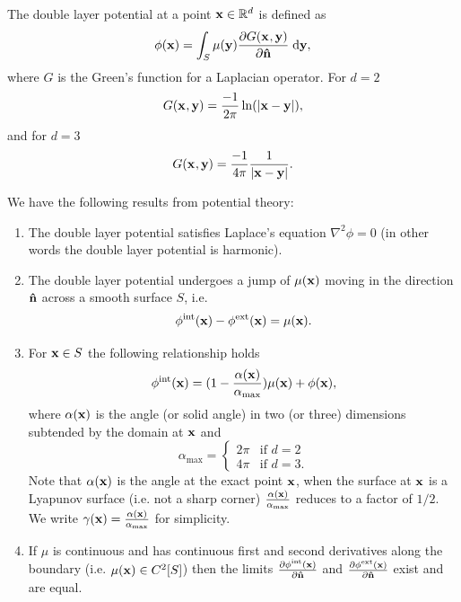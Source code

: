 The double layer potential at a point $\mathbf{x} \in \mathbb{R}^d$ is defined as \cite{eom_double_layer_potential}
\begin{equation}
  \label{eq:3}
  \phi(\mathbf{x}) = \int_{S} \mu(\mathbf{y}) \frac{\partial G(\mathbf{x}_{},\mathbf{y})}{\partial \mathbf{\hat{n}}} {\; \text{d}} \mathbf{y},
\end{equation}
where $G$ is the Green's function for a Laplacian operator.
For $d=2$
\[ G(\mathbf{x}_{},\mathbf{y}) = \dfrac{-1}{2\pi}\ln(|\mathbf{x} - \mathbf{y}|), \]
and for $d=3$
\begin{equation} G(\mathbf{x}_{},\mathbf{y}) = \dfrac{-1}{4 \pi} \dfrac{1}{|\mathbf{x} - \mathbf{y}|}.
  \label{eqn:greenslaplacian3d}
\end{equation}


We have the following results from potential theory:\cite{Sternberg1946}
\begin{enumerate}
\item The double layer potential satisfies Laplace's equation $\nabla^2 \phi = 0$ (in other words the double layer potential is harmonic).%

\item The double layer potential undergoes a jump of $\mu(\mathbf{x})$ moving in the direction $\mathbf{\hat{n}}$ across a smooth surface $S$, i.e.
  \begin{equation}
    \label{eq:15}
    \phi^{\text{int}}(\mathbf{x}) - \phi^{\text{ext}}(\mathbf{x}) = \mu(\mathbf{x}).
  \end{equation}

\item For $\mathbf{x} \in S$ the following relationship holds
  \begin{equation}
    \phi^{\text{int}}(\mathbf{x}) = (1 - \frac{\alpha(\mathbf{x})}{\alpha_{\text{max}}}) \mu(\mathbf{x}) + \phi(\mathbf{x}),
    \label{eq:22}
  \end{equation}
  where $\alpha(\mathbf{x})$ is the angle (or solid angle) in two (or three) dimensions subtended by the domain at $\mathbf{x}$ and
\begin{equation*}
  \alpha_{\text{max}} =
  \begin{cases}
    2 \pi & \text{if } d=2 \\
    4 \pi & \text{if } d=3.
  \end{cases}\label{eq:16}
\end{equation*}
Note that $\alpha(\mathbf{x})$ is the angle at the exact point $\mathbf{x}$, when the surface at $\mathbf{x}$ is a Lyapunov surface (i.e. not a sharp corner) $\frac{\alpha(\mathbf{x})}{\alpha_{\text{max}}}$ reduces to a factor of $1/2$. We write $\gamma(\mathbf{x}) = \frac{\alpha(\mathbf{x})}{\alpha_{\text{max}}}$ for simplicity.

\item If $\mu$ is continuous and has continuous first and second derivatives along the boundary (i.e. $\mu(\mathbf{x}) \in C^2[S]$) then the limits $\frac{\partial \phi^{\text{int}}(\mathbf{x})}{\partial \mathbf{\hat{n}}}$ and $\frac{\partial \phi^{\text{ext}}(\mathbf{x})}{\partial \mathbf{\hat{n}}}$ exist and are equal. %

\end{enumerate}

